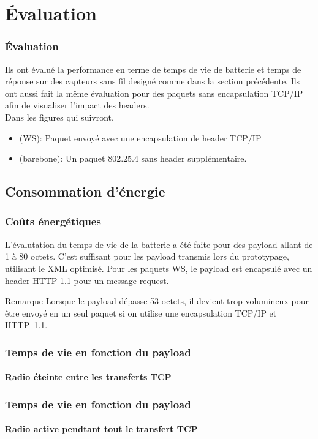 \section{Évaluation}
\begin{frame}
\frametitle{Évaluation}
Ils ont évalué la performance en terme de temps de vie de batterie et temps de réponse sur des capteurs sans fil designé comme dans la section précédente.
Ils ont aussi fait la même évaluation pour des paquets sans encapsulation TCP/IP afin de visualiser l'impact des headers.\\
\vspace{5mm}
Dans les figures qui suivront,
\begin{itemize}
 \item (WS): Paquet envoyé avec une encapsulation de header TCP/IP %
 \item (barebone): Un paquet 802.25.4 sans header supplémentaire.
\end{itemize}
\end{frame}

\subsection{Consommation d'énergie}
\begin{frame}
 \frametitle{Coûts énergétiques}
 L'évalutation du temps de vie de la batterie a été faite pour des payload allant de 1 à 80 octets.
 C'est suffisant pour les payload transmis lors du prototypage, utilisant le XML optimisé.
 Pour les paquets WS, le payload est encapsulé avec un header HTTP 1.1 pour un message request.
 \begin{block}{Remarque}
  Lorsque le payload dépasse 53 octets, il devient trop volumineux pour être envoyé en un seul paquet si on utilise une encapsulation TCP/IP et HTTP~1.1.
 \end{block}
\end{frame}

\begin{frame}
 \frametitle{Temps de vie en fonction du payload}
 \framesubtitle{Radio éteinte entre les transferts TCP}
\end{frame}

\begin{frame}
 \frametitle{Temps de vie en fonction du payload}
 \framesubtitle{Radio active pendtant tout le transfert TCP}
\end{frame}

